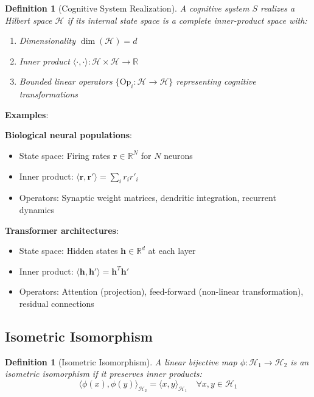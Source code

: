 \documentclass[11pt]{article}
\newtheorem{definition}[theorem]{Definition}
\begin{document}
\begin{definition}[Cognitive System Realization]
A cognitive system $S$ realizes a Hilbert space $\mathcal{H}$ if its internal state space is a complete inner-product space with:
\begin{enumerate}
\item Dimensionality $\dim(\mathcal{H}) = d$
\item Inner product $\langle \cdot, \cdot \rangle : \mathcal{H} \times \mathcal{H} \to \mathbb{R}$
\item Bounded linear operators $\{\text{Op}_i : \mathcal{H} \to \mathcal{H}\}$ representing cognitive transformations
\end{enumerate}
\end{definition}

\textbf{Examples}:

\textbf{Biological neural populations}:
\begin{itemize}
\item State space: Firing rates $\mathbf{r} \in \mathbb{R}^N$ for $N$ neurons
\item Inner product: $\langle \mathbf{r}, \mathbf{r}' \rangle = \sum_i r_i r'_i$
\item Operators: Synaptic weight matrices, dendritic integration, recurrent dynamics
\end{itemize}

\textbf{Transformer architectures}:
\begin{itemize}
\item State space: Hidden states $\mathbf{h} \in \mathbb{R}^d$ at each layer
\item Inner product: $\langle \mathbf{h}, \mathbf{h}' \rangle = \mathbf{h}^T \mathbf{h}'$
\item Operators: Attention (projection), feed-forward (non-linear transformation), residual connections
\end{itemize}

\subsection{Isometric Isomorphism}

\begin{definition}[Isometric Isomorphism]
A linear bijective map $\phi : \mathcal{H}_1 \to \mathcal{H}_2$ is an isometric isomorphism if it preserves inner products:
\[
\langle \phi(x), \phi(y) \rangle_{\mathcal{H}_2} = \langle x, y \rangle_{\mathcal{H}_1} \quad \forall x,y \in \mathcal{H}_1
\]
\end{definition}
\end{document}

